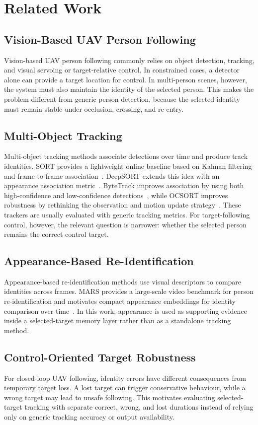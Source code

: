 \section{Related Work}

\subsection{Vision-Based UAV Person Following}

Vision-based UAV person following commonly relies on object detection, tracking, and visual servoing or target-relative control. In constrained cases, a detector alone can provide a target location for control. In multi-person scenes, however, the system must also maintain the identity of the selected person. This makes the problem different from generic person detection, because the selected identity must remain stable under occlusion, crossing, and re-entry.

\subsection{Multi-Object Tracking}

Multi-object tracking methods associate detections over time and produce track identities. SORT provides a lightweight online baseline based on Kalman filtering and frame-to-frame association~\cite{bewley2016sort}. DeepSORT extends this idea with an appearance association metric~\cite{wojke2017deepsort}. ByteTrack improves association by using both high-confidence and low-confidence detections~\cite{zhang2022bytetrack}, while OCSORT improves robustness by rethinking the observation and motion update strategy~\cite{cao2023ocsort}. These trackers are usually evaluated with generic tracking metrics. For target-following control, however, the relevant question is narrower: whether the selected person remains the correct control target.

\subsection{Appearance-Based Re-Identification}

Appearance-based re-identification methods use visual descriptors to compare identities across frames. MARS provides a large-scale video benchmark for person re-identification and motivates compact appearance embeddings for identity comparison over time~\cite{zheng2016mars}. In this work, appearance is used as supporting evidence inside a selected-target memory layer rather than as a standalone tracking method.

\subsection{Control-Oriented Target Robustness}

For closed-loop UAV following, identity errors have different consequences from temporary target loss. A lost target can trigger conservative behaviour, while a wrong target may lead to unsafe following. This motivates evaluating selected-target tracking with separate correct, wrong, and lost durations instead of relying only on generic tracking accuracy or output availability.
